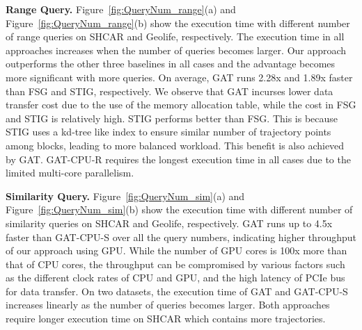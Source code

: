 \documentclass[10pt,conference,letterpaper]{IEEEtran}
\newcommand{\frname}{GAT\xspace }
\begin{document}
\vspace{0.1cm}\textbf{Range Query.}
Figure~\ref{fig:QueryNum_range}(a) and Figure~\ref{fig:QueryNum_range}(b) show the execution time with different number of range queries on SHCAR and Geolife, respectively. The execution time in all approaches increases when the number of queries becomes larger.
Our approach outperforms the other three baselines in all cases and the advantage becomes more significant with more queries.
On average, \frname runs 2.28x and 1.89x faster than FSG and STIG, respectively. We observe that GAT incurses lower data transfer cost due to the use of the memory allocation table, while the cost in FSG and STIG is relatively high.
STIG performs better than FSG. This is because STIG uses a kd-tree like index to ensure similar number of trajectory points among blocks, leading to more balanced workload. This benefit is also achieved by \frname. \frname-CPU-R requires the longest execution time in all cases due to the limited multi-core parallelism.



\vspace{0.1cm}\textbf{Similarity Query.}
Figure~\ref{fig:QueryNum_sim}(a) and Figure~\ref{fig:QueryNum_sim}(b) show the execution time with different number of similarity queries on SHCAR and Geolife, respectively. \frname runs up to 4.5x faster than \frname-CPU-S over all the query numbers, indicating higher throughput of our approach using GPU. While the number of GPU cores is 100x more than that of CPU cores, the throughput can be compromised by various factors such as the different clock rates of CPU and GPU, and the high latency of PCIe bus for data transfer.
On two datasets, the execution time of \frname and \frname-CPU-S increases linearly as the number of queries becomes larger. Both approaches require longer execution time on SHCAR which contains more trajectories.
\end{document}
